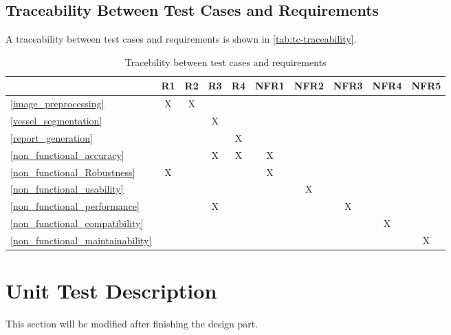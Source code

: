 \documentclass[12pt, titlepage]{article}
\begin{document}
\subsection{Traceability Between Test Cases and Requirements}

A traceability between test cases and requirements is shown in \autoref{tab:tc-traceability}.

\begin{table}[h!]
\begin{center}
\begin{tabular}{ l|c|c|c|c|c|c|c|c|c }
\hline
 & R1   & R2 & R3 & R4  & NFR1 & NFR2 & NFR3 & NFR4 & NFR5 \\
\hline
\ref{image_preprocessing} & X & X & & & & & & \\
\hline
\ref{vessel_segmentation} &  & &X & & & & & \\
\hline
\ref{report_generation} & &  & &X & & & & \\
\hline
\ref{non_functional_accuracy} &  &  &X  & X & X & & & \\
\hline
\ref{non_functional_Robustness} &X  &  &  &  & X & & & \\
\hline	
\ref{non_functional_usability} & & & & & & X & & & \\
\hline
\ref{non_functional_performance} & & &X & & & & X & & \\
\hline
\ref{non_functional_compatibility} & & & & & & & & X & \\
\hline
\ref{non_functional_maintainability} & & & & & & & & & X \\

\hline
\end{tabular}
\caption{Tracebility between test cases and requirements}
\label{tab:tc-traceability}
\end{center}
\end{table}

\section{Unit Test Description}
\label{unit_test}
This section will be modified after finishing the design part.
\end{document}
